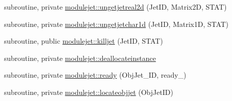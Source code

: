 \begin{DoxyCompactItemize}
\item 
subroutine, private \mbox{\hyperlink{namespacemodulejet_a3faa436f5c17dc03c594506d8e2e37ac}{modulejet\+::ungetjetreal2d}} (Jet\+ID, Matrix2D, S\+T\+AT)
\item 
subroutine, private \mbox{\hyperlink{namespacemodulejet_aaa0ceb23e085072c0cf5693f217b27ea}{modulejet\+::ungetjetchar1d}} (Jet\+ID, Matrix1D, S\+T\+AT)
\item 
subroutine, public \mbox{\hyperlink{namespacemodulejet_a98749a91e325a4b4041aa46d5abfde4e}{modulejet\+::killjet}} (Jet\+ID, S\+T\+AT)
\item 
subroutine, private \mbox{\hyperlink{namespacemodulejet_aed198ff7ee371124ec0afa1cd4cfe116}{modulejet\+::deallocateinstance}}
\item 
subroutine, private \mbox{\hyperlink{namespacemodulejet_a08cf17884b67eb6e393c3f7553f6398f}{modulejet\+::ready}} (Obj\+Jet\+\_\+\+ID, ready\+\_\+)
\item 
subroutine, private \mbox{\hyperlink{namespacemodulejet_a0b2668a76b18f69741deda8796740f8f}{modulejet\+::locateobjjet}} (Obj\+Jet\+ID)
\end{DoxyCompactItemize}
